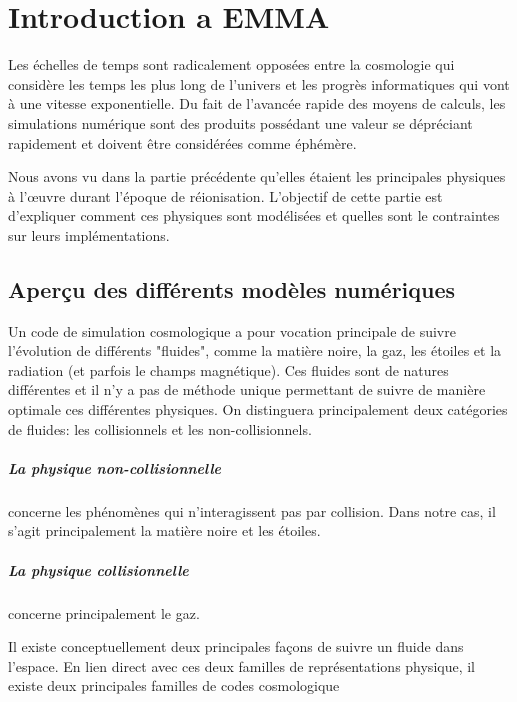 \chapter{Introduction a EMMA}
\label{ch:introduction}

Les échelles de temps sont radicalement opposées entre la cosmologie qui considère les temps les plus long de l'univers et les progrès informatiques qui vont à une vitesse exponentielle.
Du fait de l'avancée rapide des moyens de calculs, les simulations numérique sont des produits possédant une valeur se dépréciant rapidement et doivent être considérées comme éphémère.

Nous avons vu dans la partie précédente qu'elles étaient les principales physiques à l’œuvre durant l'époque de réionisation.
L'objectif de cette partie est d'expliquer comment ces physiques sont modélisées et quelles sont le contraintes sur leurs  implémentations.


\section{Aperçu des différents modèles numériques}

Un code de simulation cosmologique a pour vocation principale de suivre l'évolution de différents "fluides", comme la matière noire, la gaz, les étoiles et la radiation (et parfois le champs magnétique).
Ces fluides sont de natures différentes et il n'y a pas de méthode unique permettant de suivre de manière optimale ces différentes physiques.
On distinguera principalement deux catégories de fluides: les collisionnels et les non-collisionnels.

\paragraph{La physique non-collisionnelle} concerne les phénomènes qui n'interagissent pas par collision.
Dans notre cas, il s'agit principalement la matière noire et les étoiles. 

\paragraph{La physique collisionnelle} concerne principalement le gaz.

Il existe conceptuellement deux principales façons de suivre un fluide dans l'espace.
En lien direct avec ces deux familles de représentations physique, il existe deux principales familles de codes cosmologique%

